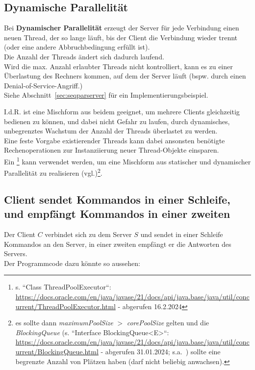\subsection*{Dynamische Parallelität}

Bei \textbf{Dynamischer Parallelität} erzeugt der Server für jede Verbindung einen neuen Thread, der so lange läuft, bis der Client die Verbindung wieder trennt (oder eine andere Abbruchbedingung erfüllt ist).\\
Die Anzahl der Threads ändert sich dadurch laufend.\\
Wird die max. Anzahl erlaubter Threads nicht kontrolliert, kann es zu einer Überlastung des Rechners kommen, auf dem der Server läuft (bspw. durch einen Denial-of-Service-Angriff.)\\
Siehe Abschnitt~\ref{sec:seqparserver} für ein Implementierungsbeispiel.

\noindent
I.d.R. ist eine Mischform aus beidem geeignet, um mehrere Clients gleichzeitig bedienen zu können, und dabei nicht Gefahr zu laufen, durch dynamisches, unbegrenztes Wachstum der Anzahl der Threads überlastet zu werden.\\
Eine feste Vorgabe existierender Threads kann dabei ansonsten benötigte Rechenoperationen zur Instanziierung neuer Thread-Objekte
einsparen.\\
Ein \footnote{
    s. ``Class ThreadPoolExecutor``: \url{https://docs.oracle.com/en/java/javase/21/docs/api/java.base/java/util/concurrent/ThreadPoolExecutor.html} - abgerufen 16.2.2024
} kann verwendet werden, um eine Mischform aus statischer und dynamischer Parallelität zu realisieren (vgl.\cite[164 u. 302]{Oec22})\footnote{
    es sollte dann \textit{maximumPoolSize} $>$ \textit{corePoolSize} gelten und die \textit{BlockingQueue} (s. ``Interface BlockingQueue<E>``: \url{https://docs.oracle.com/en/java/javase/21/docs/api/java.base/java/util/concurrent/BlockingQueue.html} - abgerufen 31.01.2024; s.a.~\cite[146]{Oec22}) sollte eine begrenzte Anzahl von Plätzen haben (darf nicht beliebig anwachsen).
}.

\subsection*{Client sendet Kommandos in einer Schleife, und empfängt Kommandos in einer zweiten}

Der Client $C$ verbindet sich zu dem Server $S$ und sendet in einer Schleife Kommandos an den Server, in einer zweiten
empfängt er die Antworten des Servers.\\
Der Programmcode dazu könnte so aussehen:


